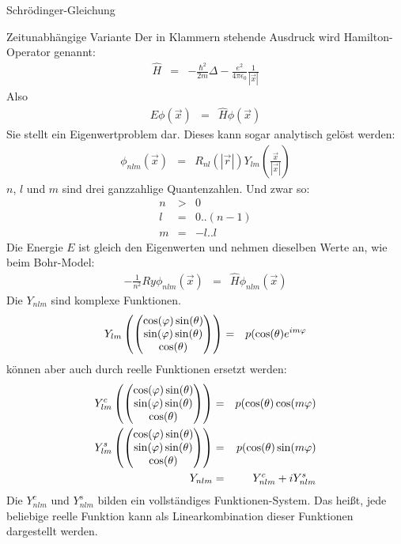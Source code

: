 \begin{chapter}{\titlestr}
\begin{section}{Schrödinger-Gleichung}
\begin{subsection}{Zeitunabhängige Variante}
Der in Klammern stehende Ausdruck wird Hamilton-Operator genannt:
\begin{eqnarray}
\label{hydrogen_hamilton_operator_def}
\hat{H}&=&-\frac{\hbar^2}{2m}\Delta-\frac{e^2}{4\pi\epsilon_0}\frac{1}{|\vec{x}|}
\end{eqnarray}
Also
\begin{eqnarray*}
E \phi(\vec{x}) &=&\hat{H}\phi(\vec{x})
\end{eqnarray*}
Sie stellt ein Eigenwertproblem dar. Dieses kann sogar analytisch gelöst werden:
\begin{eqnarray*}
\phi_{nlm}(\vec{x})&=& R_{nl}(|\vec{r}|)Y_{lm}\left(\frac{\vec{x}}{|\vec{x}|}\right)
\end{eqnarray*}
$n$, $l$ und $m$ sind drei ganzzahlige Quantenzahlen. Und zwar so:
\begin{eqnarray*}
n &>& 0\\
l &=& 0..(n-1)\\
m&=& -l .. l
\end{eqnarray*}
Die Energie $E$ ist gleich den Eigenwerten und nehmen dieselben Werte an, wie beim Bohr-Model:
\begin{eqnarray*}
-\frac{1}{n^2}Ry \phi_{nlm}(\vec{x}) &=&\hat{H}\phi_{nlm}(\vec{x})
\end{eqnarray*}
Die $Y_{nlm}$ sind komplexe Funktionen.
\begin{eqnarray*}
Y_{lm}\left(\begin{pmatrix} \cos(\varphi)\sin(\theta)
\\
\sin(\varphi)\sin(\theta)\\
\cos(\theta) \end{pmatrix}\right) &=& p(\cos(\theta)e^{im\varphi}
\end{eqnarray*}
können aber auch durch reelle Funktionen ersetzt werden:
\begin{eqnarray*}
Y^c_{lm}\left(\begin{pmatrix} \cos(\varphi)\sin(\theta)
\\
\sin(\varphi)\sin(\theta)\\
\cos(\theta) \end{pmatrix}\right) &=& p(\cos(\theta)\cos(m\varphi)\\
Y^s_{lm}\left(\begin{pmatrix} \cos(\varphi)\sin(\theta)
\\
\sin(\varphi)\sin(\theta)\\
\cos(\theta) \end{pmatrix}\right) &=& p(\cos(\theta)\sin(m\varphi)\\
Y_{nlm} &=& Y^c_{nlm}+iY^s_{nlm}
\end{eqnarray*}
Die $Y^c_{nlm}$ und $Y^s_{nlm}$ bilden ein vollständiges Funktionen-System. Das heißt, jede beliebige reelle Funktion kann als Linearkombination dieser Funktionen dargestellt werden.
\end{subsection}


\end{section}
\end{chapter}
